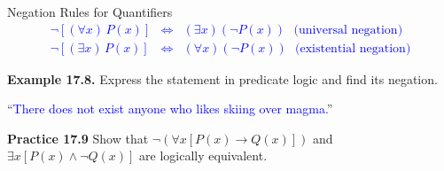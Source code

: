 \documentclass[aspectratio=169]{beamer}
\providecommand{\Blue}[1]{\textcolor{blue}{#1}}
\begin{document}
\begin{frame}[plain]{Negation Rules  for Quantifiers}
   \Blue{
   \begin{eqnarray*}
     \neg\left[ (\forall x)\, P(x)\right] &\Leftrightarrow & (\exists x) (\neg P(x))\ \ \ \mbox{(universal negation)} \\
     \neg\left[ (\exists x)\, P(x) \right] &\Leftrightarrow & (\forall x) (\neg P(x)) \ \ \ \mbox{(existential negation)}
   \end{eqnarray*}
   }
   
   \medskip
   
 {\bf Example 17.8.} Express the statement in predicate logic and find its negation.
      \begin{center}
         ``\Blue{There does not exist anyone who likes skiing over magma.}''   
      \end{center}
 \medskip
 \pause
 
{\bf Practice 17.9} 
  Show that $\neg\left(\forall x [P(x)\rightarrow Q(x)]\right)$ and
    $\exists x [P(x)\wedge \neg Q(x)]$ are logically equivalent. %
 
\end{frame}
\fi%
\end{document}
